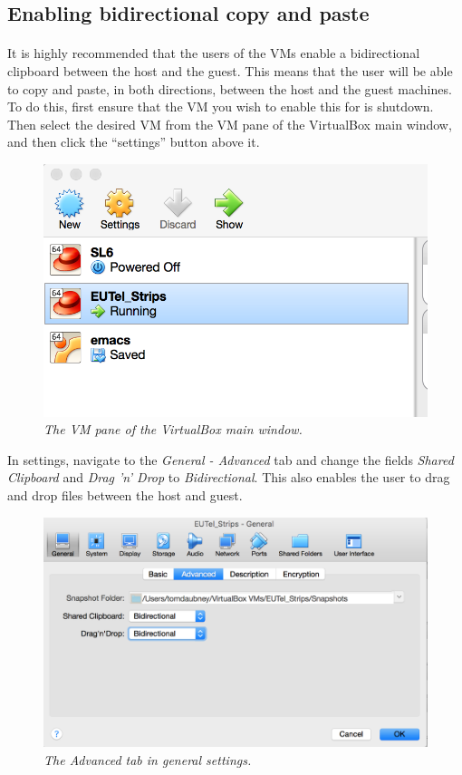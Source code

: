 \documentclass[11pt]{article}
\begin{document}
\subsection{Enabling bidirectional copy and paste}
\paragraph{}
It is highly recommended that the users of the VMs enable a bidirectional clipboard between the host and the guest. This means that the user will be able to copy and paste, in both directions, between the host and the guest machines. To do this, first ensure that the VM you wish to enable this for is shutdown. Then select the desired VM from the VM pane of the VirtualBox main window, and then click the ``settings'' button above it.
\begin{figure}[!ht]
	\centering
	\includegraphics[scale=0.4]{copypaste1.png}
	\caption{\textit{The VM pane of the VirtualBox main window.}}
\end{figure}
In settings, navigate to the \textit{General - Advanced} tab and change the fields \textit{Shared Clipboard} and \textit{Drag 'n' Drop} to \textit{Bidirectional}. This also enables the user to drag and drop files between the host and guest.
\begin{figure}[!ht]
	\centering
	\includegraphics[scale=0.3]{copypaste2.png}
	\caption{\textit{The Advanced tab in general settings.}}
\end{figure}
\end{document}
